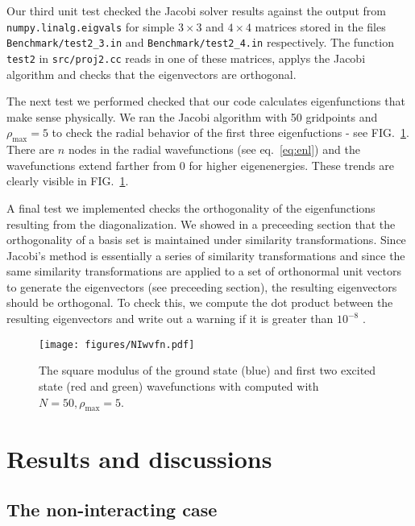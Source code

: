 \documentclass[10pt,showpacs,preprintnumbers,footinbib,amsmath,amssymb,aps,prl,twocolumn,groupedaddress,superscriptaddress,showkeys]{revtex4-1}
\newcommand{\pwrten}[1]{%
	\ensuremath{10^{#1}} }
\newcommand{\rhomax}{
	\ensuremath{ \rho _{\mathrm{max}}} }
\begin{document}
{Our third unit test checked the Jacobi solver results against the output from 
\texttt{numpy.linalg.eigvals} for simple $3 \times 3$ and $4 \times 4$ matrices stored in the
files \texttt{Benchmark/test2\_3.in} and \texttt{Benchmark/test2\_4.in} respectively. The
function \texttt{test2} in \texttt{src/proj2.cc} reads in one of these matrices, applys the
Jacobi algorithm and checks that the eigenvectors are orthogonal.

The next test we performed checked that our code calculates eigenfunctions that make
sense physically. We ran the Jacobi algorithm with 50 gridpoints and $\rhomax=5$ to
check the radial behavior of the first three eigenfuctions - see FIG.~\ref{fig:NIwvfn}.
There are $n$ nodes in the radial wavefunctions (see eq.~\ref{eq:enl}) and the
wavefunctions extend farther from 0 for higher eigenenergies. These trends are clearly
visible in FIG.~\ref{fig:NIwvfn}. 

A final test we implemented checks the orthogonality of the eigenfunctions resulting from
the diagonalization. We showed in a preceeding section that the orthogonality of a basis set
is maintained under similarity transformations. Since Jacobi's method is essentially a series of
similarity transformations and since the same similarity transformations are applied to a set
of orthonormal unit vectors to generate the eigenvectors (see preceeding section), the resulting
eigenvectors should be orthogonal. To check this, we compute the dot product between the
resulting eigenvectors and write out a warning if it is greater than \pwrten{-8}.

\begin{figure}
\centering
	\texttt{[image: figures/NIwvfn.pdf]}
	\caption{The square modulus of the ground state (blue) and first two excited state (red and
	green) wavefunctions with computed with $N=50, \rhomax=5$.}
	\label{fig:NIwvfn}
\end{figure}


\section{Results and discussions}

\subsection{The non-interacting case}

}
\end{document}
